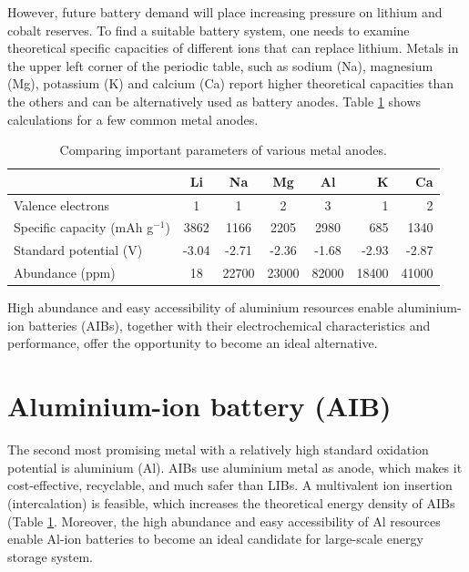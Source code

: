 However, future battery demand will place increasing pressure on lithium and cobalt reserves\cite{turchen}. To find a suitable battery system, one needs to examine theoretical specific capacities of different ions that can replace lithium. Metals in the upper left corner of the periodic table, such as sodium (Na), magnesium (Mg), potassium (K) and calcium (Ca) report higher theoretical capacities than the others and can be alternatively used as battery anodes. Table  \ref{table2} shows calculations for a few common metal anodes. 

\begin{table}[tbh!]
\caption{Comparing important parameters of various metal anodes.} \label{table2}
\begin{tabular}{lccccrr}
\hline
 & \textbf{Li} & \textbf{Na} & \textbf{Mg} & \textbf{Al} & \textbf{K} & \textbf{Ca}\\
\hline
Valence electrons & 1 & 1 & 2 & 3 & 1 & 2\\
Specific capacity (mAh g$^{-1}$) & 3862 & 1166 & 2205 & 2980 & 685 & 1340\\
Standard potential (V) & -3.04 & -2.71 & -2.36  & -1.68 & -2.93 & -2.87\\
Abundance (ppm) & 18 & 22700 & 23000 & 82000 & 18400 & 41000\\
\hline  %
\end{tabular}
\end{table}

High abundance and easy accessibility of aluminium resources enable aluminium-ion batteries (AIBs), together with their electrochemical characteristics and performance, offer the opportunity to become an ideal alternative.

\section{Aluminium-ion battery (AIB)}
The second most promising metal with a relatively high standard oxidation potential is aluminium (Al). AIBs use aluminium metal as anode, which makes it cost-effective, recyclable, and much safer than LIBs. A multivalent ion insertion (intercalation) is feasible, which increases the theoretical energy density of AIBs (Table \ref{table2}. Moreover, the high abundance and easy accessibility of Al resources enable Al-ion batteries to become an ideal candidate for large-scale energy storage system. 

